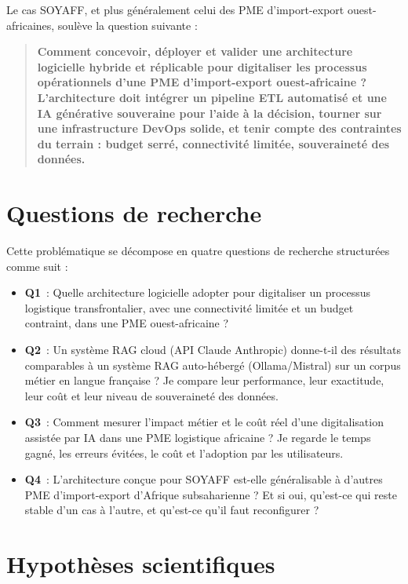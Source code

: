 Le cas SOYAFF, et plus généralement celui des PME d'import-export ouest-africaines, soulève la question suivante :

\begin{quote}
    \textbf{Comment concevoir, déployer et valider une architecture logicielle hybride et réplicable pour digitaliser les processus opérationnels d'une PME d'import-export ouest-africaine ? L'architecture doit intégrer un pipeline ETL automatisé et une IA générative souveraine pour l'aide à la décision, tourner sur une infrastructure DevOps solide, et tenir compte des contraintes du terrain : budget serré, connectivité limitée, souveraineté des données.}
\end{quote}

\section*{Questions de recherche}
\label{sec:questions_recherche}

Cette problématique se décompose en quatre questions de recherche structurées comme suit :
\begin{itemize}
    \item \textbf{Q1}~: Quelle architecture logicielle adopter pour digitaliser un processus logistique transfrontalier, avec une connectivité limitée et un budget contraint, dans une PME ouest-africaine ?
    \item \textbf{Q2}~: Un système RAG cloud (API Claude Anthropic) donne-t-il des résultats comparables à un système RAG auto-hébergé (Ollama/Mistral) sur un corpus métier en langue française ? Je compare leur performance, leur exactitude, leur coût et leur niveau de souveraineté des données.
    \item \textbf{Q3}~: Comment mesurer l'impact métier et le coût réel d'une digitalisation assistée par IA dans une PME logistique africaine ? Je regarde le temps gagné, les erreurs évitées, le coût et l'adoption par les utilisateurs.
    \item \textbf{Q4}~: L'architecture conçue pour SOYAFF est-elle généralisable à d'autres PME d'import-export d'Afrique subsaharienne ? Et si oui, qu'est-ce qui reste stable d'un cas à l'autre, et qu'est-ce qu'il faut reconfigurer ?
\end{itemize}

\section*{Hypothèses scientifiques}
\label{sec:hypotheses}

